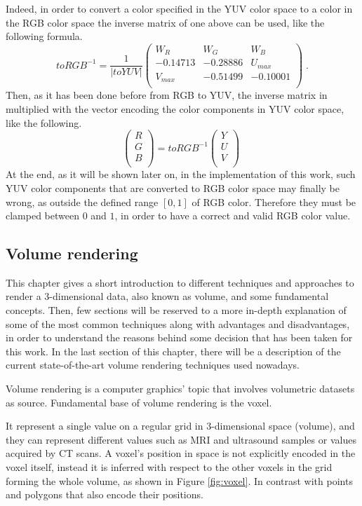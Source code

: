 \documentclass[12pt,a4paper]{extarticle}
\newcommand{\linespace}{\vspace{0pt}}
\newcommand{\myparagraph}[1]{\paragraph{#1}\mbox{}\\}
\begin{document}
Indeed, in order to convert a color specified in the YUV color space to a color in the RGB color space the inverse matrix of one above can be used, like the following formula.
\[
toRGB^{-1} = \frac{1}{|toYUV|}
\begin{pmatrix}
W_{R} & W_{G} & W_{B}\\
-0.14713 & -0.28886 & U_{max}\\
V_{max} & -0.51499& -0.10001\\
\end{pmatrix}
\;.
\]
Then, as it has been done before from RGB to YUV, the inverse matrix in multiplied with the vector encoding the color components in YUV color space, like the following.
\[
\begin{pmatrix}
 R\\
 G\\
 B\\
\end{pmatrix}
=
toRGB^{-1}
\begin{pmatrix}
Y\\
U\\
V\\
\end{pmatrix}
\;
\]
At the end, as it will be shown later on, in the implementation of this work, such YUV color components that are converted to RGB color space may finally be wrong, as outside the defined range $[0,1]$ of RGB color. Therefore they must be clamped between $0$ and $1$, in order to have a correct and valid RGB color value.

\pagebreak
\subsection{Volume rendering} 
This chapter gives a short introduction to different techniques and approaches to render a 3-dimensional data, also known as volume, and some fundamental concepts. Then, few sections will be reserved to a more in-depth explanation of some of the most common techniques along with advantages and disadvantages, in order to understand the reasons behind some decision that has been taken for this work. In the last section of this chapter, there will be a description of the current state-of-the-art volume rendering techniques used nowadays.
\linespace

Volume rendering is a computer graphics' topic that involves volumetric datasets as source. Fundamental base of volume rendering is the voxel. 

It represent a single value on a regular grid in 3-dimensional space (volume), and they can represent different values such as MRI and ultrasound samples or values acquired by CT scans. A voxel's position in space is not explicitly encoded in the voxel itself, instead it is inferred with respect to the other voxels in the grid forming the whole volume, as shown in Figure \ref{fig:voxel}. In contrast with points and polygons that also encode their positions. %
\end{document}
